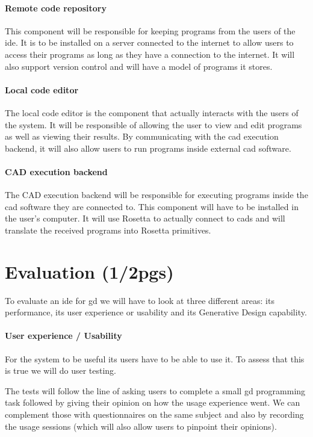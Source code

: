 \documentclass{./llncs2e/llncs}
\begin{document}
	\paragraph{Remote code repository}
		This component will be responsible for keeping programs from the users of the \ac{ide}.
		It is to be installed on a server connected to the internet to allow users to access their programs as long as they have a connection to the internet.
		It will also support version control and will have a model of programs it stores.
		
	\paragraph{Local code editor}
		The local code editor is the component that actually interacts with the users of the system.
		It will be responsible of allowing the user to view and edit programs as well as viewing their results.
		By communicating with the \ac{cad} execution backend, it will also allow users to run programs inside external \ac{cad} software.
		
	\paragraph{CAD execution backend}
		The CAD execution backend will be responsible for executing programs inside the \ac{cad} software they are connected to.
		This component will have to be installed in the user's computer.
		It will use Rosetta\cite{de2012modern} to actually connect to \ac{cad}s and will translate the received programs into Rosetta primitives.

\section{Evaluation (1/2pgs)}
	To evaluate an \ac{ide} for \ac{gd} we will have to look at three different areas:
	its performance, its user experience or usability and its Generative Design capability.
	
	\paragraph{User experience / Usability}
	For the system to be useful its users have to be able to use it.
	To assess that this is true we will do user testing.
	
	The tests will follow the line of asking users to complete a small \ac{gd} programming task followed by giving their opinion on how the usage experience went.
	We can complement those with questionnaires on the same subject and also by recording the usage sessions (which will also allow users to pinpoint their opinions).
	
\end{document}
